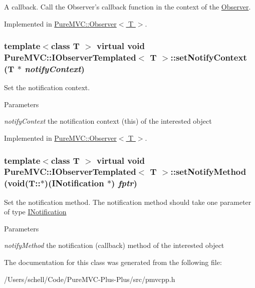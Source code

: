 A callback. Call the Observer's callback function in the context of the \hyperlink{class_pure_m_v_c_1_1_observer}{Observer}. 

Implemented in \hyperlink{class_pure_m_v_c_1_1_observer_a79996aa1a9b0d7e03c333ec177df74f1}{PureMVC::Observer$<$ T $>$}.\hypertarget{class_pure_m_v_c_1_1_i_observer_templated_ad2f9264afea485375876ef3a976b0ba5}{
\subsubsection[{setNotifyContext}]{\setlength{\rightskip}{0pt plus 5cm}template$<$class T $>$ virtual void {\bf PureMVC::IObserverTemplated}$<$ T $>$::setNotifyContext (T $\ast$ {\em notifyContext})}}
\label{class_pure_m_v_c_1_1_i_observer_templated_ad2f9264afea485375876ef3a976b0ba5}


Set the notification context. 
\begin{DoxyParams}{Parameters}
\item[{\em notifyContext}]the notification context (this) of the interested object \end{DoxyParams}


Implemented in \hyperlink{class_pure_m_v_c_1_1_observer_a832268c15c727dd0ba0b31fc5bf91308}{PureMVC::Observer$<$ T $>$}.\hypertarget{class_pure_m_v_c_1_1_i_observer_templated_a6d8b0b888b2d1efd0801b75451e7c8df}{
\subsubsection[{setNotifyMethod}]{\setlength{\rightskip}{0pt plus 5cm}template$<$class T $>$ virtual void {\bf PureMVC::IObserverTemplated}$<$ T $>$::setNotifyMethod (void(T::$\ast$)({\bf INotification} $\ast$) {\em fptr})}}
\label{class_pure_m_v_c_1_1_i_observer_templated_a6d8b0b888b2d1efd0801b75451e7c8df}


Set the notification method. The notification method should take one parameter of type {\ttfamily \hyperlink{class_pure_m_v_c_1_1_i_notification}{INotification}}


\begin{DoxyParams}{Parameters}
\item[{\em notifyMethod}]the notification (callback) method of the interested object \end{DoxyParams}


The documentation for this class was generated from the following file:\begin{DoxyCompactItemize}
\item 
/Users/schell/Code/PureMVC-\/Plus-\/Plus/src/pmvcpp.h\end{DoxyCompactItemize}
